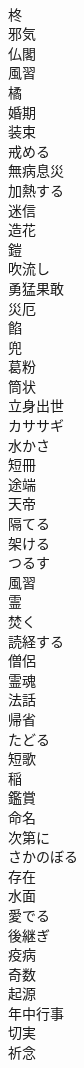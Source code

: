 \documentclass[8pt]{extreport}
\begin{document}
\begin{CJK}{UTF8}{min}
\\	柊
\\	邪気
\\	仏閣
\\	風習
\\	橘
\\	婚期
\\	装束
\\	戒める
\\	無病息災
\\	加熱する
\\	迷信
\\	造花
\\	鎧
\\	吹流し
\\	勇猛果敢
\\	災厄
\\	餡
\\	兜
\\	葛粉
\\	筒状
\\	立身出世
\\	カササギ
\\	水かさ
\\	短冊
\\	途端
\\	天帝
\\	隔てる
\\	架ける
\\	つるす
\\	風習
\\	霊
\\	焚く
\\	読経する
\\	僧侶
\\	霊魂
\\	法話
\\	帰省
\\	たどる
\\	短歌
\\	稲
\\	鑑賞
\\	命名
\\	次第に
\\	さかのぼる
\\	存在
\\	水面
\\	愛でる
\\	後継ぎ
\\	疫病
\\	奇数
\\	起源
\\	年中行事
\\	切実
\\	祈念

\end{CJK}
\end{document}

